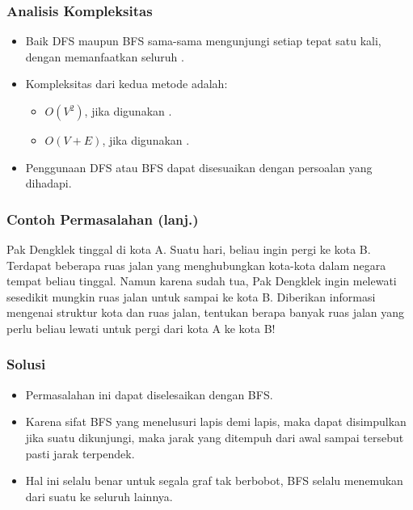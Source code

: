 \begin{frame}
\frametitle{Analisis Kompleksitas}
\begin{itemize}
  \item Baik DFS maupun BFS sama-sama mengunjungi setiap \fnode tepat satu kali, dengan memanfaatkan seluruh \fedge.
  \item Kompleksitas dari kedua metode adalah:
  \begin{itemize}
    \item $O(V^2)$, jika digunakan \fadjacencymatrix.
    \item $O(V + E)$, jika digunakan \fadjacencylist.
    \newline
  \end{itemize}
  \item Penggunaan DFS atau BFS dapat disesuaikan dengan persoalan yang dihadapi.
\end{itemize}
\end{frame}

\begin{frame}
\frametitle{Contoh Permasalahan (lanj.)}
Pak Dengklek tinggal di kota A. Suatu hari, beliau ingin pergi ke kota B. Terdapat beberapa ruas jalan yang menghubungkan kota-kota dalam negara tempat beliau tinggal. Namun karena sudah tua, Pak Dengklek ingin melewati sesedikit mungkin ruas jalan untuk sampai ke kota B.
\newline\newline
Diberikan informasi mengenai struktur kota dan ruas jalan, tentukan berapa banyak ruas jalan yang perlu beliau lewati untuk pergi dari kota A ke kota B!
\end{frame}

\begin{frame}
\frametitle{Solusi}
\begin{itemize}
  \item Permasalahan ini dapat diselesaikan dengan BFS. 
  \item Karena sifat BFS yang menelusuri \fnode lapis demi lapis, maka dapat disimpulkan jika suatu \fnode dikunjungi, maka jarak yang ditempuh dari awal sampai \fnode tersebut pasti jarak terpendek.
  \item Hal ini selalu benar untuk segala graf tak berbobot, BFS selalu menemukan  dari suatu \fnode ke seluruh \fnode lainnya.
\end{itemize}
\end{frame}

